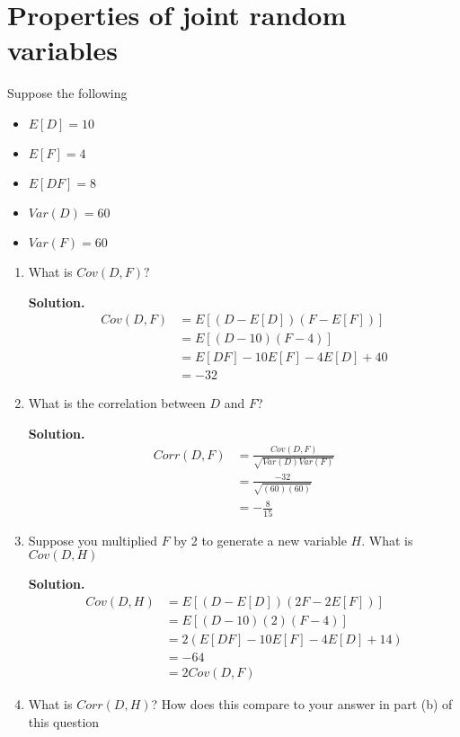 \documentclass[12pt]{article}
\begin{document}
\section{Properties of joint random variables}

Suppose the following 
\begin{itemize}
    \item $E[D]=10$
    \item $E[F]=4$
    \item $E[DF] = 8$
    \item $Var(D)= 60$
    \item $Var(F) = 60$
\end{itemize}
\begin{enumerate}
    \item What is $Cov(D,F)?$

    \textbf{Solution.}
    \begin{align*}
        Cov(D,F) &= E[(D-E[D])(F-E[F])]
        \\ &= E[(D-10)(F-4)]
        \\ &= E[DF] - 10E[F]- 4E[D]+40
        \\ &= -32
    \end{align*}

    \item What is the correlation between $D$ and $F$?

    \textbf{Solution.}
    \begin{align*}
        Corr(D,F) &= \frac{Cov(D,F)}{\sqrt{Var(D)Var(F)}}
        \\ &= \frac{-32}{\sqrt{(60)(60)}}
        \\ &= -\frac{8}{15}
    \end{align*}

    \item Suppose you multiplied $F$ by 2 to generate a new variable $H$. What is $Cov(D,H)$

    \textbf{Solution.}
    \begin{align*}
        Cov(D,H) &= E[(D-E[D])(2F-2E[F])]
        \\ &= E[(D-10)(2)(F-4)]
        \\ &= 2(E[DF] - 10E[F]- 4E[D]+14)
        \\ &= -64
        \\ &= 2Cov(D,F)
    \end{align*}

    \item What is $Corr(D,H)$? How does this compare to your answer in part (b) of this question


\end{enumerate}
\end{document}

